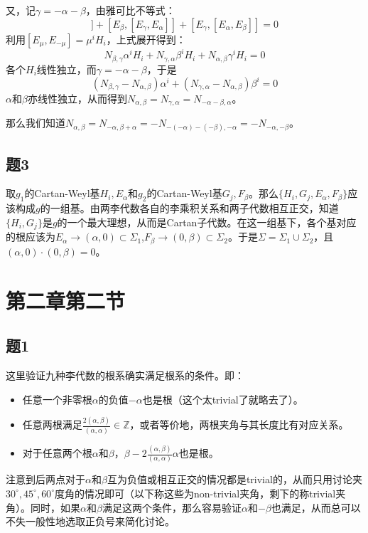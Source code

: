 \documentclass{ctexart}
\begin{document}
	又，记$\gamma=-\alpha-\beta$，由雅可比不等式：
	\begin{equation}
	[E_\alpha,[E_\beta,E_\gamma]]+[E_\beta,[E_\gamma,E_\alpha]]+[E_\gamma,[E_\alpha,E_\beta]]=0
	\end{equation}
	利用$[E_\mu,E_{-\mu}]=\mu^i H_i$，上式展开得到：
	\begin{equation}
	N_{\beta,\gamma}\alpha^iH_i+N_{\gamma,\alpha}\beta^iH_i+N_{\alpha,\beta}\gamma^iH_i=0
	\end{equation}
	各个$H_i$线性独立，而$\gamma=-\alpha-\beta$，于是
	\begin{equation}
	(N_{\beta,\gamma}-N_{\alpha,\beta})\alpha^i+(N_{\gamma,\alpha}-N_{\alpha,\beta})\beta^i=0
	\end{equation}
	$\alpha$和$\beta$亦线性独立，从而得到$N_{\alpha,\beta}=N_{\gamma,\alpha}=N_{-\alpha-\beta,\alpha}$。
	
	那么我们知道$N_{\alpha,\beta}=N_{-\alpha,\beta+\alpha}=-N_{-(-\alpha)-(-\beta),-\alpha}=-N_{-\alpha,-\beta}$。
	
	\subsection{题3}
	
	取$g_1$的Cartan-Weyl基$H_i,E_\alpha$和$g_2$的Cartan-Weyl基$G_j,F_\beta$。那么$\{H_i,G_j,E_\alpha,F_\beta\}$应该构成$g$的一组基。由两李代数各自的李乘积关系和两子代数相互正交，知道$\{H_i,G_j\}$是$g$的一个最大理想，从而是Cartan子代数。在这一组基下，各个基对应的根应该为$E_\alpha\to(\alpha,0)\subset\Sigma_1$,$F_\beta\to(0,\beta)\subset\Sigma_2$。于是$\Sigma=\Sigma_1\cup\Sigma_2$，且$(\alpha,0)\cdot(0,\beta)=0$。
	
	\section{第二章第二节}
	
	\subsection{题1}
	
	这里验证九种李代数的根系确实满足根系的条件。即：
	\begin{itemize}
		\item 任意一个非零根$\alpha$的负值$-\alpha$也是根（这个太trivial了就略去了）。
		\item 任意两根满足$\frac{2(\alpha,\beta)}{(\alpha,\alpha)}\in\mathbb Z$，或者等价地，两根夹角与其长度比有对应关系。
		\item 对于任意两个根$\alpha$和$\beta$，$\beta-2\frac{(\alpha,\beta)}{(\alpha,\alpha)}\alpha$也是根。
	\end{itemize}
	注意到后两点对于$\alpha$和$\beta$互为负值或相互正交的情况都是trivial的，从而只用讨论夹$30^\circ,45^\circ,60^\circ$度角的情况即可（以下称这些为non-trivial夹角，剩下的称trivial夹角）。同时，如果$\alpha$和$\beta$满足这两个条件，那么容易验证$\alpha$和$-\beta$也满足，从而总可以不失一般性地选取正负号来简化讨论。
	
\end{document}

